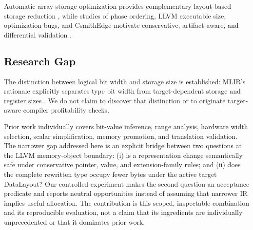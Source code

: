 \documentclass[11pt,twocolumn]{article}
\begin{document}
Automatic array-storage optimization provides complementary layout-based storage
reduction \citep{bhaskaracharya2016storage}, while studies of phase ordering, LLVM
executable size, optimization bugs, and CsmithEdge motivate conservative,
artifact-aware, and differential validation
\citep{jantz2014phase,jain2019executable,zhou2021bugs,evenmendoza2022csmith}.

\subsection{Research Gap}

The distinction between logical bit width and storage size is established:
MLIR's rationale explicitly separates type bit width from target-dependent
storage and register sizes \citep{mlirRationale}. We do not claim to discover
that distinction or to originate target-aware compiler profitability checks.

Prior work individually covers bit-value inference, range analysis, hardware
width selection, scalar simplification, memory promotion, and translation
validation. The narrower gap addressed here is an explicit bridge between two
questions at the LLVM memory-object boundary: (i) is a representation change
semantically safe under conservative pointer, value, and extension-family
rules; and (ii) does the complete rewritten type occupy fewer bytes under the
active target DataLayout? Our controlled experiment makes the second question
an acceptance predicate and reports neutral opportunities instead of assuming
that narrower IR implies useful allocation. The contribution is this scoped,
inspectable combination and its reproducible evaluation, not a claim that its
ingredients are individually unprecedented or that it dominates prior work.
\end{document}
